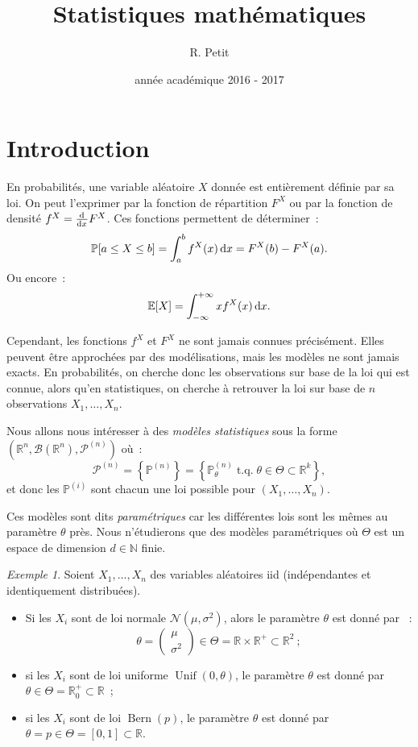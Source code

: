 \documentclass{report}
\title{Statistiques mathématiques}
\author{R. Petit}
\date{année académique 2016 - 2017}
\DeclareMathOperator{\tq}{\text{ t.q. }}
\DeclareMathOperator{\Unif}{Unif}  %
\DeclareMathOperator{\Bern}{Bern}  %
\renewcommand{\P}{\mathbb P}
\newcommand{\E}{\mathbb E}
\newcommand{\minfty}{{-\infty}}
\newcommand{\pinfty}{{+\infty}}
\newcommand{\statmod}[4]{\left(#1^{#4}, #2\left(#1^{#4}\right), #3^{\left(#4\right)}\right)}
\newcommand{\Nms}{\mathcal N(\mu, \sigma^2)}
\newcommand{\vvp}[2]{\begin{pmatrix}#1 \\ #2\end{pmatrix}}
\newcommand{\N}{\mathbb N}
\newcommand{\R}{\mathbb R}
\newcommand{\Brl}{\mathcal B}  %
\theoremstyle{definition}
\theoremstyle{remark}
\newtheorem{ex}{Exemple}[chapter]
\begin{document}
\maketitle
\tableofcontents
\newpage
\setcounter{page}{1}

\chapter*{Introduction}
	En probabilités, une variable aléatoire $X$ donnée est entièrement définie par sa loi. On peut l'exprimer par la fonction de répartition $F^X$ ou par la
	fonction de densité $f^X = \od {}xF^X$. Ces fonctions permettent de déterminer~:
	\[\P[a \leq X \leq b] = \int_a^bf^X(x)\dif x = F^X(b) - F^X(a).\]
	Ou encore~:
	\[\E[X] = \int_\minfty^\pinfty xf^X(x)\dif x.\]

	Cependant, les fonctions $f^X$ et $F^X$ ne sont jamais connues précisément. Elles peuvent être approchées par des modélisations, mais les modèles ne sont
	jamais exacts. En probabilités, on cherche donc les observations sur base de la loi qui est connue, alors qu'en statistiques, on cherche à retrouver la loi
	sur base de $n$ observations $X_1, \ldots, X_n$.

	Nous allons nous intéresser à des \textit{modèles statistiques} sous la forme $\statmod \R\Brl{\mathcal P}n$ où~:
	\[\mathcal P^{(n)} = \left\{\P^{(n)}\right\} = \left\{\P^{(n)}_\theta \tq \theta \in \Theta \subset \R^k\right\},\]
	et donc les $\P^{(i)}$ sont chacun une loi possible pour $(X_1, \ldots, X_n)$.

	Ces modèles sont dits \textit{paramétriques} car les différentes lois sont les mêmes au paramètre $\theta$ près. Nous n'étudierons que des modèles
	paramétriques où $\Theta$ est un espace de dimension $d \in \N$ finie.

	\begin{ex} Soient $X_1,\ldots, X_n$ des variables aléatoires iid (indépendantes et identiquement distribuées).
	\begin{itemize}
		\item Si les $X_i$ sont de loi normale $\Nms$, alors le paramètre $\theta$ est donné par ~:
		      \[\theta = \vvp \mu{\sigma^2} \in \Theta = \R \times \R^+ \subset \R^2~;\]
		\item si les $X_i$ sont de loi uniforme $\Unif(0, \theta)$, le paramètre $\theta$ est donné par $\theta \in \Theta = \R_0^+ \subset \R$~;
		\item si les $X_i$ sont de loi $\Bern(p)$, le paramètre $\theta$ est donné par $\theta = p \in \Theta = [0, 1] \subset \R$.
	\end{itemize}
	\end{ex}
\end{document}
